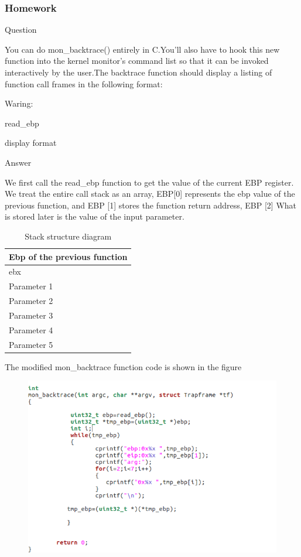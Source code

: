 \subsubsection{Homework }
\begin{flushleft}
{\Large Question}
\end{flushleft}

You can do mon\_backtrace() entirely in C.You'll also have to hook this new function into the kernel monitor's command list so that it can be invoked interactively by the user.The backtrace function should display a listing of function call frames in the following format:

Waring:

read\_ebp

display format

\begin{flushleft}
{\Large Answer}
\end{flushleft}



We first call the read\_ebp function to get the value of the current EBP register. We treat the entire call stack as an array, EBP[0] represents the ebp value of the previous function, and EBP [1] stores the function return address, EBP [2] What is stored later is the value of the input parameter.

\begin{table}[H]
\centering
\begin{tabular}{ |p{150pt}| }\toprule
\hline			
Ebp of the previous function  \\ \hline		
ebx \\ \hline 		
Parameter 1 \\ \hline 	
Parameter 2 \\ \hline
Parameter 3 \\ \hline
Parameter 4 \\ \hline
Parameter 5 \\ \hline
\end{tabular}
\caption{Stack structure diagram}
\end{table}

The modified mon\_backtrace function code is shown in the figure
\begin{figure}[H]
  \centering
  \includegraphics[width=0.8\linewidth]{figure/mon_backtrace_code}
\end{figure}

